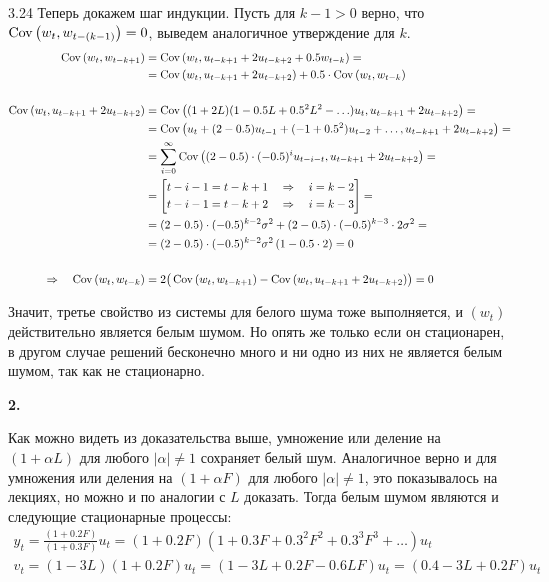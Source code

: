 \begin{solution}{{3.24}}
Теперь докажем шаг индукции. Пусть для $k-1 > 0$ верно, что $\operatorname{Cov}{\left(w_t, w_{t-(k-1)}\right)} = 0$, выведем аналогичное утверждение для $k$.
\begin{align*}
    \operatorname{Cov}{\left(w_t, w_{t-k+1}\right)} &= \operatorname{Cov}{\left(w_t, u_{t-k+1} + 2u_{t-k+2} + 0.5w_{t-k}\right)} = \\
    &= \operatorname{Cov}{\left(w_t, u_{t-k+1} + 2u_{t-k+2}\right)} + 0.5 \cdot \operatorname{Cov}{\left(w_t, w_{t-k}\right)} \\ \\
    \operatorname{Cov}{\left(w_t, u_{t-k+1} + 2u_{t-k+2}\right)} &= \operatorname{Cov}{\left((1 + 2L) (1 - 0.5L + 0.5^2 L^2 - \ldots)u_t, u_{t-k+1} + 2u_{t-k+2}\right)} = \\
    &= \operatorname{Cov}{\left(u_t + (2 - 0.5)u_{t-1} + (-1 +0.5^2)u_{t-2} + \ldots, u_{t-k+1} + 2u_{t-k+2}\right)} = \\
    &= \sum_{i=0}^{\infty} \operatorname{Cov}{\left((2 - 0.5) \cdot (-0.5)^i u_{t-i-t}, u_{t-k+1} + 2u_{t-k+2}\right)} = \\
    &= \left[\begin{aligned}
        t - i - 1 = t - k + 1 \quad \Rightarrow \quad i = k - 2 \\
        t - i - 1 = t - k + 2 \quad \Rightarrow \quad i = k - 3 \\
    \end{aligned}\right] = \\
    &= (2 - 0.5) \cdot (-0.5)^{k-2} \sigma^2 + (2 - 0.5) \cdot (-0.5)^{k-3}\cdot 2 \sigma^2 = \\
    &= (2 - 0.5) \cdot (-0.5)^{k-2} \sigma^2 \left(1 - 0.5 \cdot 2\right) = 0 \\ \\
    \Rightarrow \quad \operatorname{Cov}{\left(w_t, w_{t-k}\right)} &= 2\big(\operatorname{Cov}{\left(w_t, w_{t-k+1}\right)} - \operatorname{Cov}{\left(w_t, u_{t-k+1} + 2u_{t-k+2}\right)}\big) = 0
\end{align*}

Значит, третье свойство из системы для белого шума тоже выполняется, и $(w_t)$ действительно является белым шумом. Но опять же только если он стационарен, в другом случае решений бесконечно много и ни одно из них не является белым шумом, так как не стационарно.

\textbf{2.}

Как можно видеть из доказательства выше, умножение или деление на $(1 + \alpha L)$ для любого $|\alpha| \neq 1$ сохраняет белый шум. Аналогичное верно и для умножения или деления на $(1 + \alpha F)$ для любого $|\alpha| \neq 1$, это показывалось на лекциях, но можно и по аналогии с $L$ доказать. Тогда белым шумом являются и следующие стационарные процессы:
\begin{gather*}
    y_t = \frac{(1 + 0.2F)}{(1 + 0.3F)} u_t = (1 + 0.2F)(1 + 0.3F + 0.3^2F^2 + 0.3^3 F^3 + \ldots) u_t\\
    v_t = (1 - 3L)(1 + 0.2 F) u_t = (1 - 3L + 0.2F - 0.6LF)u_t = (0.4 - 3L + 0.2F) u_t
\end{gather*}
  
\end{solution}
